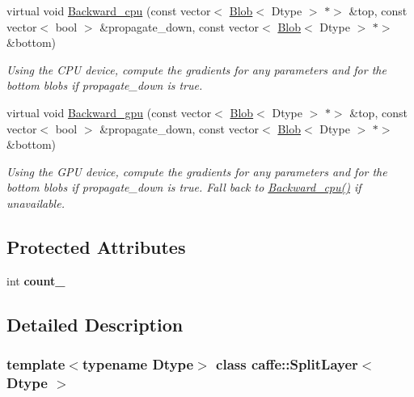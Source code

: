 \begin{DoxyCompactItemize}
virtual void \mbox{\hyperlink{classcaffe_1_1_split_layer_a8beb05b4c929f6a48b88c4e6bcda458d}{Backward\+\_\+cpu}} (const vector$<$ \mbox{\hyperlink{classcaffe_1_1_blob}{Blob}}$<$ Dtype $>$ $\ast$$>$ \&top, const vector$<$ bool $>$ \&propagate\+\_\+down, const vector$<$ \mbox{\hyperlink{classcaffe_1_1_blob}{Blob}}$<$ Dtype $>$ $\ast$$>$ \&bottom)
\begin{DoxyCompactList}\small\item\em Using the C\+PU device, compute the gradients for any parameters and for the bottom blobs if propagate\+\_\+down is true. \end{DoxyCompactList}\item 
\mbox{\label{classcaffe_1_1_split_layer_adfdd98a92c7e0eed33c1fa77d2852a33}} 
virtual void \mbox{\hyperlink{classcaffe_1_1_split_layer_adfdd98a92c7e0eed33c1fa77d2852a33}{Backward\+\_\+gpu}} (const vector$<$ \mbox{\hyperlink{classcaffe_1_1_blob}{Blob}}$<$ Dtype $>$ $\ast$$>$ \&top, const vector$<$ bool $>$ \&propagate\+\_\+down, const vector$<$ \mbox{\hyperlink{classcaffe_1_1_blob}{Blob}}$<$ Dtype $>$ $\ast$$>$ \&bottom)
\begin{DoxyCompactList}\small\item\em Using the G\+PU device, compute the gradients for any parameters and for the bottom blobs if propagate\+\_\+down is true. Fall back to \mbox{\hyperlink{classcaffe_1_1_split_layer_a8a4a5231eafdf8c35596de50cac9185c}{Backward\+\_\+cpu()}} if unavailable. \end{DoxyCompactList}\end{DoxyCompactItemize}
\subsection*{Protected Attributes}
\begin{DoxyCompactItemize}
\item 
\mbox{\label{classcaffe_1_1_split_layer_a61d5ab69fcee07756a4a4655b33f3f75}} 
int {\bfseries count\+\_\+}
\end{DoxyCompactItemize}


\subsection{Detailed Description}
\subsubsection*{template$<$typename Dtype$>$\newline
class caffe\+::\+Split\+Layer$<$ Dtype $>$}


